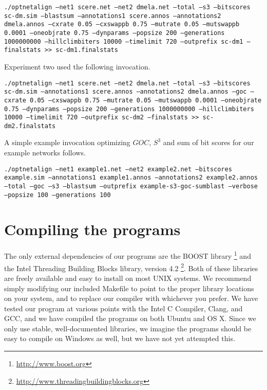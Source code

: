 \documentclass[11pt]{article} %
\begin{document}
\texttt{./optnetalign --net1 scere.net --net2 dmela.net --total --s3 --bitscores sc-dm.sim --blastsum --annotations1 scere.annos --annotations2 dmela.annos --cxrate 0.05 --cxswappb 0.75 --mutrate 0.05 --mutswappb 0.0001 --oneobjrate 0.75 --dynparams --popsize 200 --generations 1000000000 --hillclimbiters 10000  --timelimit 720 --outprefix sc-dm1 --finalstats >> sc-dm1.finalstats}

Experiment two used the following invocation.

\texttt{./optnetalign --net1 scere.net --net2 dmela.net --total --s3 --bitscores sc-dm.sim --annotations1 scere.annos --annotations2 dmela.annos --goc --cxrate 0.05 --cxswappb 0.75 --mutrate 0.05 --mutswappb 0.0001 --oneobjrate 0.75 --dynparams --popsize 200 --generations 1000000000 --hillclimbiters 10000  --timelimit 720 --outprefix sc-dm2 --finalstats >> sc-dm2.finalstats}

A simple example invocation optimizing \(GOC\), \(S^3\) and sum of bit scores for our example networks follows. 

\texttt{./optnetalign --net1 example1.net --net2 example2.net --bitscores example.sim --annotations1 example1.annos --annotations2 example2.annos --total --goc --s3 --blastsum --outprefix example-s3-goc-sumblast --verbose --popsize 100 --generations 100}

\section{Compiling the programs}
The only external dependencies of our programs are the BOOST library \footnote{\url{http://www.boost.org}} and the Intel Threading Building Blocks library, version 4.2 \footnote{\url{http://www.threadingbuildingblocks.org}}. Both of these libraries are freely available and easy to install on most UNIX systems. We recommend simply modifying our included Makefile to point to the proper library locations on your system, and to replace our compiler with whichever you prefer. We have tested our program at various points with the Intel C Compiler, Clang, and GCC, and we have compiled the programs on both Ubuntu and OS X. Since we only use stable, well-documented libraries, we imagine the programs should be easy to compile on Windows as well, but we have not yet attempted this. 
\end{document}
